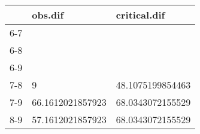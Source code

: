 \begin{table}[ht]
\centering
\begin{tabular}{rll}
  \hline
 & obs.dif & critical.dif \\ 
  \hline
6-7 &  &  \\ 
  6-8 &  &  \\ 
  6-9 &  &  \\ 
  7-8 & 9 & 48.1075199854463 \\ 
  7-9 & 66.1612021857923 & 68.0343072155529 \\ 
  8-9 & 57.1612021857923 & 68.0343072155529 \\ 
   \hline
\end{tabular}
\end{table}
